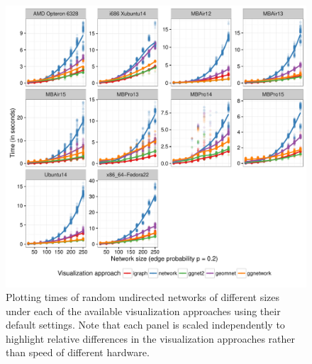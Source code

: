 \begin{figure}[hbtp]
\centering


\includegraphics[width=\textwidth]{figure/runtimes-all-1.pdf}
\caption{\label{fig.cap:runtimes-random}%
Plotting times of random undirected networks of different sizes under each of the available visualization approaches using their default settings. Note that each panel is scaled independently to highlight relative differences in the visualization approaches rather than speed of different hardware.
}
\end{figure}

